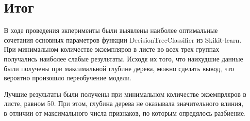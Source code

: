\documentclass[a4paper,12pt]{article}
\begin{document}
\begin{longtable}{|p{0.5cm}|p{10cm}|p{3cm}|}
\hline
\end{longtable}


\newpage\section{Итог}
	В ходе проведения экперименты были выявлены наиболее оптимальные сочетания основных параметров функции DecisionTreeClassifier из Skikit-learn. При минимальном количестве экземпляров в листе во всех трех группах получались наиболее слабые результаты. Исходя их того, что наихудшие данные были получены при максимальной глубине дерева, можно сделать вывод, что вероятно произошло переобучение модели. 
	
	\vspace{0.5cm}
	Лучшие результаты были получены при минимальном количестве экземпрляров в листе, равном 50. При этом, глубина дерева не оказывала значительного влиния, в отличии от максимального числа признаков, по которым опредялось разбиение. 
	
	
\end{document}
